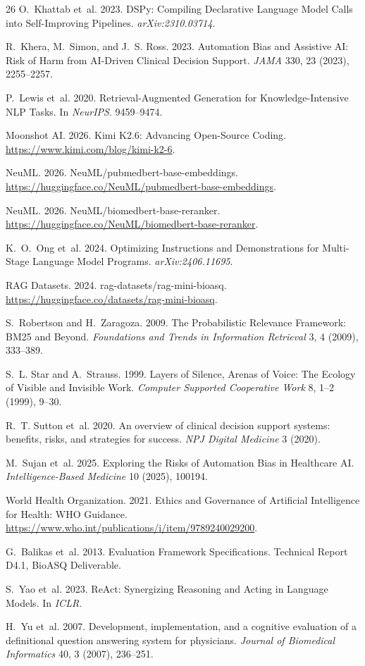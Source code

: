 \documentclass[sigconf,nonacm]{acmart}
\begin{document}
\begin{thebibliography}{26}
O.~Khattab et~al. 2023. DSPy: Compiling Declarative Language Model Calls into Self-Improving Pipelines. \emph{arXiv:2310.03714}.

R.~Khera, M.~Simon, and J.~S. Ross. 2023. Automation Bias and Assistive AI: Risk of Harm from AI-Driven Clinical Decision Support. \emph{JAMA} 330, 23 (2023), 2255--2257.

P.~Lewis et~al. 2020. Retrieval-Augmented Generation for Knowledge-Intensive NLP Tasks. In \emph{NeurIPS}. 9459--9474.

Moonshot AI. 2026. Kimi K2.6: Advancing Open-Source Coding. \url{https://www.kimi.com/blog/kimi-k2-6}.

NeuML. 2026. NeuML/pubmedbert-base-embeddings. \url{https://huggingface.co/NeuML/pubmedbert-base-embeddings}.

NeuML. 2026. NeuML/biomedbert-base-reranker. \url{https://huggingface.co/NeuML/biomedbert-base-reranker}.

K.~O.~Ong et~al. 2024. Optimizing Instructions and Demonstrations for Multi-Stage Language Model Programs. \emph{arXiv:2406.11695}.

RAG Datasets. 2024. rag-datasets/rag-mini-bioasq. \url{https://huggingface.co/datasets/rag-mini-bioasq}.

S.~Robertson and H.~Zaragoza. 2009. The Probabilistic Relevance Framework: BM25 and Beyond. \emph{Foundations and Trends in Information Retrieval} 3, 4 (2009), 333--389.

S.~L. Star and A.~Strauss. 1999. Layers of Silence, Arenas of Voice: The Ecology of Visible and Invisible Work. \emph{Computer Supported Cooperative Work} 8, 1--2 (1999), 9--30.

R.~T. Sutton et~al. 2020. An overview of clinical decision support systems: benefits, risks, and strategies for success. \emph{NPJ Digital Medicine} 3 (2020).

M.~Sujan et~al. 2025. Exploring the Risks of Automation Bias in Healthcare AI. \emph{Intelligence-Based Medicine} 10 (2025), 100194.

World Health Organization. 2021. Ethics and Governance of Artificial Intelligence for Health: WHO Guidance. \url{https://www.who.int/publications/i/item/9789240029200}.

G.~Balikas et~al. 2013. Evaluation Framework Specifications. Technical Report D4.1, BioASQ Deliverable.

S.~Yao et~al. 2023. ReAct: Synergizing Reasoning and Acting in Language Models. In \emph{ICLR}.

H.~Yu et~al. 2007. Development, implementation, and a cognitive evaluation of a definitional question answering system for physicians. \emph{Journal of Biomedical Informatics} 40, 3 (2007), 236--251.

\end{thebibliography}
\end{document}
